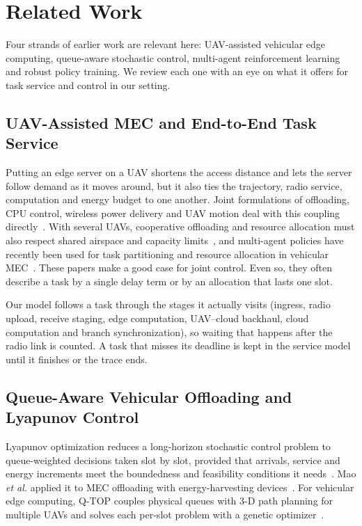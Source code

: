 \section{Related Work}
Four strands of earlier work are relevant here: UAV-assisted vehicular edge
computing, queue-aware stochastic control, multi-agent reinforcement learning
and robust policy training. We review each one with an eye on what it offers
for task service and control in our setting.

\subsection{UAV-Assisted MEC and End-to-End Task Service}
Putting an edge server on a UAV shortens the access distance and lets the
server follow demand as it moves around, but it also ties the trajectory,
radio service, computation and energy budget to one another. Joint
formulations of offloading, CPU control, wireless power delivery and UAV
motion deal with this coupling directly~\cite{liu2020uav,xiong2021energy}.
With several UAVs, cooperative offloading and resource allocation must also
respect shared airspace and capacity limits~\cite{guo2024multi}, and
multi-agent policies have recently been used for task partitioning and
resource allocation in vehicular MEC~\cite{liang2025rav}. These papers make a
good case for joint control. Even so, they often describe a task by a single
delay term or by an allocation that lasts one slot.

Our model follows a task through the stages it actually visits (ingress,
radio upload, receive staging, edge computation, UAV--cloud backhaul, cloud
computation and branch synchronization), so waiting that happens after the
radio link is counted. A task that misses its deadline is kept in the
service model until it finishes or the trace ends.

\subsection{Queue-Aware Vehicular Offloading and Lyapunov Control}
Lyapunov optimization reduces a long-horizon stochastic control problem to
queue-weighted decisions taken slot by slot, provided that arrivals, service
and energy increments meet the boundedness and feasibility conditions it
needs~\cite{neely2010stochastic}. Mao \emph{et al.} applied it to MEC
offloading with energy-harvesting devices~\cite{mao2017dynamic}. For
vehicular edge computing, Q-TOP couples physical queues with 3-D path
planning for multiple UAVs and solves each per-slot problem with a genetic
optimizer~\cite{sun2026qtop}.

